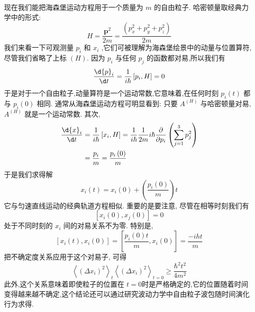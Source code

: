 \documentclass[lang=cn,newtx,10pt,scheme=chinese,thmcnt=section]{elegantbook}
\begin{document}
现在我们能把海森堡运动方程用于一个质量为 $m$ 的自由粒子. 哈密顿量取经典力学中的形式:
\begin{equation}
	H = \frac{{\mathbf{p}}^{2}}{2m} = \frac{\left( {p}_{x}^{2} + {p}_{y}^{2} + {p}_{z}^{2}\right) }{2m}
\end{equation}
我们来看一下可观测量 ${p}_{i}$ 和 ${x}_{i}$ ,它们可被理解为海森堡绘景中的动量与位置算符,尽管我们省略了上标 $\left( H\right)$. 因为 ${p}_{i}$ 与任何 ${p}_{j}$ 的函数都对易,所以我们有
\begin{equation}
	\frac{\d{p}_{i}}{\d t} = \frac{1}{i\hbar }\left\lbrack {{p}_{i}, H}\right\rbrack = 0
\end{equation}
于是对于一个自由粒子,动量算符是一个运动常数,它意味着,在任何时刻 ${p}_{i}\left( t\right)$ 都与 ${p}_{i}\left( 0\right)$ 相同. 通常从海森堡运动方程可明显看到: 只要 ${A}^{\left( H\right) }$ 与哈密顿量对易, ${A}^{\left( H\right) }$ 就是一个运动常数. 其次,
\begin{equation}
	\begin{aligned}
		\frac{\d{x}_{i}}{\d t} &= \frac{1}{i\hbar }\left\lbrack {{x}_{i}, H}\right\rbrack = \frac{1}{i\hbar }\frac{1}{2m}i\hbar \frac{\partial }{\partial {p}_{i}}\left( {\mathop{\sum }\limits_{{j = 1}}^{3}{p}_{j}^{2}}\right)\\
		&= \frac{{p}_{i}}{m} = \frac{{p}_{i}\left( 0\right) }{m}
	\end{aligned}
\end{equation}
于是我们求得解
\begin{equation}
	{x}_{i}\left( t\right) = {x}_{i}\left( 0\right) + \left( \frac{{p}_{i}\left( 0\right) }{m}\right) t
\end{equation}
它与匀速直线运动的经典轨道方程相似. 重要的是要注意, 尽管在相等时刻我们有
\begin{equation}
	\left\lbrack {{x}_{i}\left( 0\right) ,{x}_{j}\left( 0\right) }\right\rbrack = 0
\end{equation}
处于不同时刻的 ${x}_{i}$ 间的对易关系不为零. 特别是,
\begin{equation}
	\left\lbrack {{x}_{i}\left( t\right) ,{x}_{i}\left( 0\right) }\right\rbrack = \left\lbrack {\frac{{p}_{i}\left( 0\right) t}{m},{x}_{i}\left( 0\right) }\right\rbrack = \frac{-{iht}}{m}
\end{equation}
把不确定度关系应用于这个对易子, 可得
\begin{equation}
	{\left\langle {\left( \Delta {x}_{i}\right) }^{2}\right\rangle }_{t}{\left\langle {\left( \Delta {x}_{i}\right) }^{2}\right\rangle }_{t = 0} \geq \frac{{\hbar }^{2}{t}^{2}}{4{m}^{2}}
\end{equation}
此外,这个关系意味着即使粒子的位置在 $t = 0$时是严格确定的,它的位置随着时间变得越来越不确定,这个结论还可以通过研究波动力学中自由粒子波包随时间演化行为求得.
\end{document}
